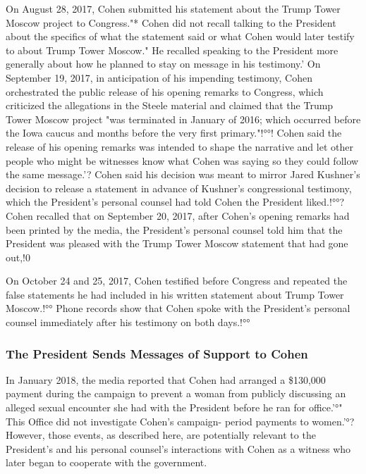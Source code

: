 On August 28, 2017, Cohen submitted his statement about the Trump Tower Moscow project to Congress."*
Cohen did not recall talking to the President about the specifics of what the statement said or what Cohen would later testify to about Trump Tower Moscow."
He recalled speaking to the President more generally about how he planned to stay on message in his testimony.'
On September 19, 2017, in anticipation of his impending testimony, Cohen orchestrated the public release of his opening remarks to Congress, which criticized the allegations in the Steele material and claimed that the Trump Tower Moscow project "was terminated in January of 2016; which occurred before the Iowa caucus and months before the very first primary."!°°!
Cohen said the release of his opening remarks was intended to shape the narrative and let other people who might be witnesses know what Cohen was saying so they could follow the same message.'?
Cohen said his decision was meant to mirror Jared Kushner's decision to release a statement in advance of Kushner's congressional testimony, which the President's personal counsel had told Cohen the President liked.!°°?
Cohen recalled that on September 20, 2017, after Cohen's opening remarks had been printed by the media, the President's personal counsel told him that the President was pleased with the Trump Tower Moscow statement that had gone out,!0%

On October 24 and 25, 2017, Cohen testified before Congress and repeated the false statements he had included in his written statement about Trump Tower Moscow.!°°
Phone records show that Cohen spoke with the President's personal counsel immediately after his testimony on both days.!°°%

\subsubsection{The President Sends Messages of Support to Cohen}

In January 2018, the media reported that Cohen had arranged a \$130,000 payment during the campaign to prevent a woman from publicly discussing an alleged sexual encounter she had with the President before he ran for office.'°"
This Office did not investigate Cohen's campaign- period payments to women.'°?
However, those events, as described here, are potentially relevant to the President's and his personal counsel's interactions with Cohen as a witness who later began to cooperate with the government.

